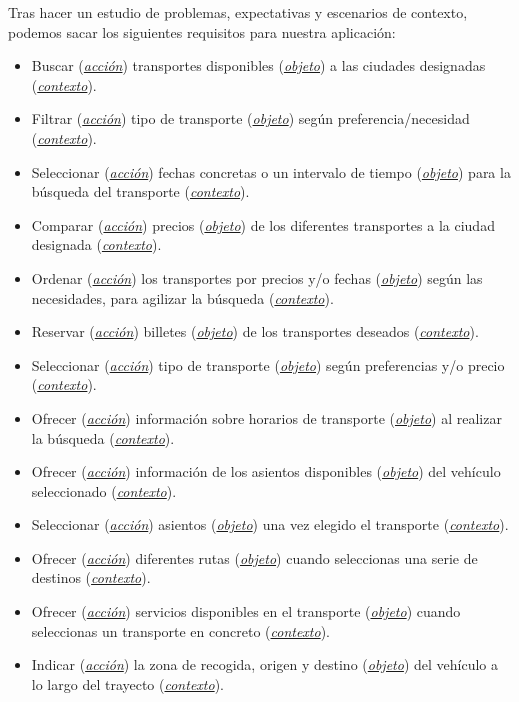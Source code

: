 Tras hacer un estudio de problemas, expectativas y escenarios de contexto, podemos sacar los siguientes requisitos para nuestra aplicación:

\begin{itemize}
    \item Buscar (\textit{\underline{acción}}) transportes disponibles (\textit{\underline{objeto}}) a las ciudades designadas (\textit{\underline{contexto}}).
    \item Filtrar (\textit{\underline{acción}}) tipo de transporte (\textit{\underline{objeto}}) según preferencia/necesidad (\textit{\underline{contexto}}).
    \item Seleccionar (\textit{\underline{acción}}) fechas concretas o un intervalo de tiempo (\textit{\underline{objeto}}) para la búsqueda del transporte (\textit{\underline{contexto}}).
    \item Comparar (\textit{\underline{acción}}) precios (\textit{\underline{objeto}}) de los diferentes transportes a la ciudad designada (\textit{\underline{contexto}}).
    \item Ordenar (\textit{\underline{acción}}) los transportes por precios y/o fechas (\textit{\underline{objeto}}) según las necesidades, para agilizar la búsqueda (\textit{\underline{contexto}}).
    \item Reservar (\textit{\underline{acción}}) billetes (\textit{\underline{objeto}}) de los transportes deseados (\textit{\underline{contexto}}).
    \item Seleccionar (\textit{\underline{acción}}) tipo de transporte (\textit{\underline{objeto}}) según preferencias y/o precio (\textit{\underline{contexto}}).
    \item Ofrecer (\textit{\underline{acción}}) información sobre horarios de transporte (\textit{\underline{objeto}}) al realizar la búsqueda (\textit{\underline{contexto}}).
    \item Ofrecer (\textit{\underline{acción}}) información de los asientos disponibles (\textit{\underline{objeto}}) del vehículo seleccionado (\textit{\underline{contexto}}).
    \item Seleccionar (\textit{\underline{acción}}) asientos (\textit{\underline{objeto}}) una vez elegido el transporte (\textit{\underline{contexto}}).
    \item Ofrecer (\textit{\underline{acción}}) diferentes rutas (\textit{\underline{objeto}}) cuando seleccionas una serie de destinos (\textit{\underline{contexto}}).
    \item Ofrecer (\textit{\underline{acción}}) servicios disponibles en el transporte (\textit{\underline{objeto}}) cuando seleccionas un transporte en concreto (\textit{\underline{contexto}}).
    \item Indicar (\textit{\underline{acción}}) la zona de recogida, origen y destino (\textit{\underline{objeto}}) del vehículo a lo largo del trayecto (\textit{\underline{contexto}}).
\end{itemize}
